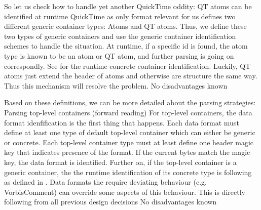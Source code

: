 So let us check how to handle yet another QuickTime oddity:
{%
QT atoms can be identified at runtime
}
{%
QuickTime as only format relevant for us defines two different generic container types: Atoms and QT atoms. Thus, we define these two types of generic containers and use the generic container identification schemes to handle the situation. At runtime, if a specific id is found, the atom type is known to be an atom or QT atom, and further parsing is going on correspondly. See  for the runtime concrete container identification.
}
{%
Luckily, QT atoms just extend the header of atoms and otherwise are structure the same way. Thus this mechanism will resolve the problem.
}
{%
No disadvantages known
}

Based on these definitions, we can be more detailed about the parsing strategies:
{%
Parsing top-level containers (forward reading)
}
{%
For top-level containers, the data format idenfification is the first thing that happens. Each data format must define at least one type of default top-level container which can either be generic or concrete. Each top-level container type must at least define one header magic key that indicates presence of the format. If the current bytes match the magic key, the data format is identified. Further on, if the top-level container is a generic container, the the runtime identification of its concrete type is following as defined in . Data formats the require deviating behaviour (e.g. VorbisComment) can override some aspects of this behaviour.
}
{%
This is directly following from all previous design decisions
}
{%
No disadvantages known
}

